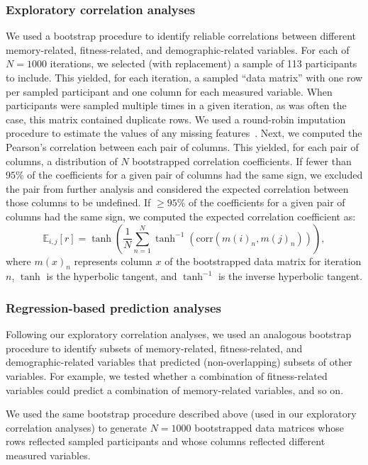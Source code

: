 \documentclass[10pt]{article}
\begin{document}
\subsubsection*{Exploratory correlation analyses}
We used a bootstrap procedure to identify reliable correlations
between different memory-related, fitness-related, and
demographic-related variables.  For each of $N = 1000$ iterations, we
selected (with replacement) a sample of 113 participants to include.
This yielded, for each iteration, a sampled ``data matrix'' with one
row per sampled participant and one column for each measured variable.
When participants were sampled multiple times in a given iteration, as
was often the case, this matrix contained duplicate rows.  We used a
round-robin imputation procedure to estimate the values of any missing
features~\citep{Buck60}.  Next, we computed the Pearson's correlation
between each pair of columns.  This yielded, for each pair of columns,
a distribution of $N$ bootstrapped correlation coefficients.  If fewer
than $95\%$ of the coefficients for a given pair of columns had the
same sign, we excluded the pair from further analysis and considered
the expected correlation between those columns to be undefined.  If
$\geq 95\%$ of the coefficients for a given pair of columns had the
same sign, we computed the expected correlation coefficient as:
\[
  \mathbb{E}_{i, j}\left[ r\right] = \tanh\left(\frac{1}{N} \sum_{n=1}^N
  \tanh^{-1}(\mathrm{corr}\left(m(i)_n, m(j)_n\right))\right),
\]
where $m(x)_n$ represents column $x$ of the bootstrapped data matrix
for iteration $n$, $\tanh$ is the hyperbolic tangent, and $\tanh^{-1}$
is the inverse hyperbolic tangent.

\subsubsection*{Regression-based prediction analyses}
Following our exploratory correlation analyses, we used an analogous
bootstrap procedure to identify subsets of memory-related,
fitness-related, and demographic-related variables that predicted
(non-overlapping) subsets of other variables.  For example, we tested
whether a combination of fitness-related variables could predict a
combination of memory-related variables, and so on.

We used the same bootstrap procedure described above (used in our
exploratory correlation analyses) to generate $N = 1000$ bootstrapped
data matrices whose rows reflected sampled participants and whose
columns reflected different measured variables.
\end{document}
